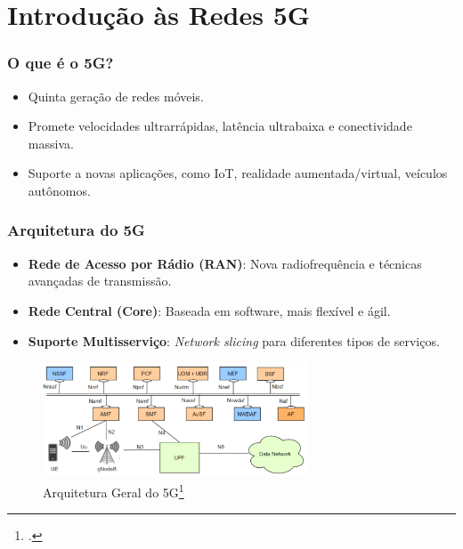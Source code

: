
\section{Introdução às Redes 5G}
\begin{frame}
    \frametitle{O que é o 5G?}
    \begin{itemize}
        \item Quinta geração de redes móveis.
        \item Promete velocidades ultrarrápidas, latência ultrabaixa e conectividade massiva.
        \item Suporte a novas aplicações, como IoT, realidade aumentada/virtual, veículos autônomos.
    \end{itemize}
\end{frame}

\begin{frame}
    \frametitle{Arquitetura do 5G}
    \begin{itemize}
        \item \textbf{Rede de Acesso por Rádio (RAN)}: Nova radiofrequência e técnicas avançadas de transmissão.
        \item \textbf{Rede Central (Core)}: Baseada em software, mais flexível e ágil.
        \item \textbf{Suporte Multisserviço}: \textit{Network slicing} para diferentes tipos de serviços.
    \end{itemize}
    \begin{figure}
        \centering
        \includegraphics[width=0.7\textwidth]{figs/ArquiteturaGeral5G}
        \caption{Arquitetura Geral do 5G\footcite{5G_architecture}}
    \end{figure}
    \vspace{0.4cm}
\end{frame}

